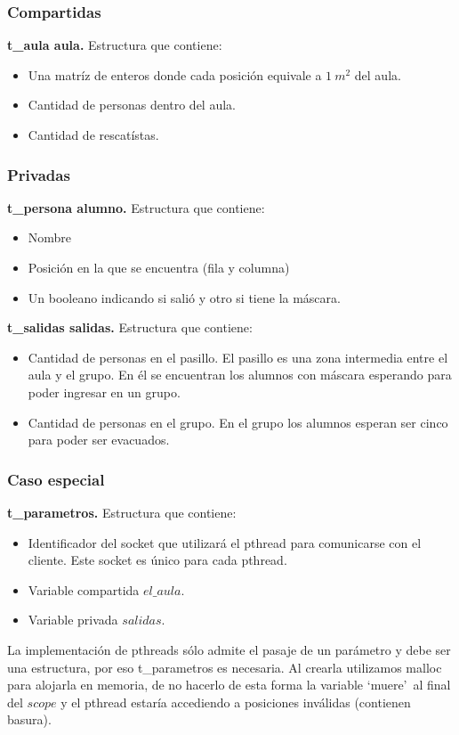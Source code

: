 \subsubsection{Compartidas}
\textbf{t\_aula aula.}
Estructura que contiene: 
\begin{itemize}
 \item Una matríz de enteros donde cada posición equivale a $1\ m^{2}$ del aula.
 \item Cantidad de personas dentro del aula.
 \item Cantidad de rescatístas.
\end{itemize}

\subsubsection{Privadas}
\textbf{t\_persona alumno.}
Estructura que contiene: 
\begin{itemize}
 \item Nombre
 \item Posición en la que se encuentra (fila y columna)
 \item Un booleano indicando si salió y otro si tiene la máscara.
\end{itemize}

\smallskip
\textbf{t\_salidas salidas.}
Estructura que contiene: 
\begin{itemize}
 \item Cantidad de personas en el pasillo. 
 El pasillo es una zona intermedia entre el aula y el grupo. En él se encuentran 
 los alumnos con máscara esperando para poder ingresar en un grupo.
 \item Cantidad de personas en el grupo. 
 En el grupo los alumnos esperan ser cinco para poder ser evacuados.
\end{itemize}

\subsubsection{Caso especial}
\textbf{t\_parametros.} 
Estructura que contiene: 
\begin{itemize}
 \item Identificador del socket que utilizará el pthread para comunicarse con el cliente.
 Este socket es único para cada pthread.
 \item Variable compartida $el\_ aula$.
 \item Variable privada $salidas$.
\end{itemize}

La implementación de pthreads sólo admite el pasaje de un parámetro y debe
ser una estructura, por eso t\_parametros es necesaria. Al crearla utilizamos malloc para alojarla en memoria, 
de no hacerlo de esta forma la variable \textquoteleft muere\textquoteright\, al final del $scope$ y
el pthread estaría accediendo a posiciones inválidas (contienen basura).